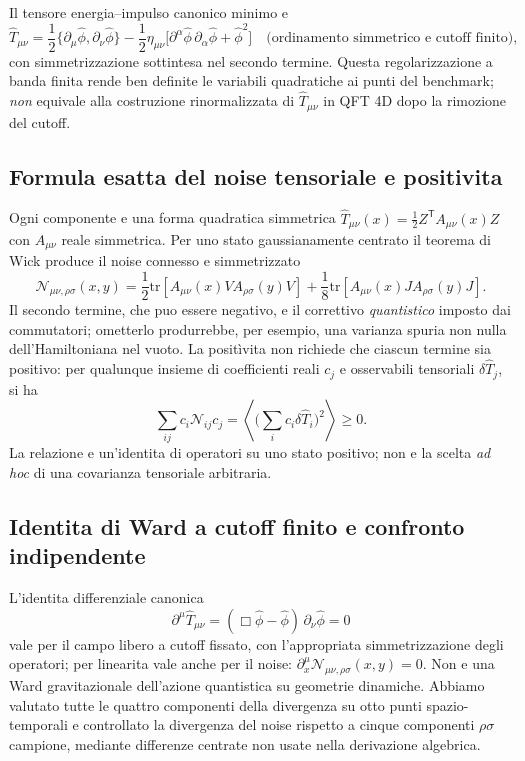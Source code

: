 \documentclass[11pt,a4paper]{article}
\begin{document}
Il tensore energia--impulso canonico minimo e
\begin{equation}
 \hat T_{\mu\nu}=\frac12\{\partial_\mu\hat\phi,\partial_\nu\hat\phi\}
 -\frac12\eta_{\mu\nu}\bigl[\partial^\alpha\hat\phi\,\partial_\alpha\hat\phi+\hat\phi^2\bigr]
 \quad\text{(ordinamento simmetrico e cutoff finito)},
 \label{eq:r12av-stress}
\end{equation}
con simmetrizzazione sottintesa nel secondo termine. Questa regolarizzazione a banda finita rende ben definite le variabili quadratiche ai punti del benchmark; \emph{non} equivale alla costruzione rinormalizzata di $\hat T_{\mu\nu}$ in QFT 4D dopo la rimozione del cutoff.

\subsection{Formula esatta del noise tensoriale e positivita}
Ogni componente e una forma quadratica simmetrica $\hat T_{\mu\nu}(x)=\frac12Z^{\mathsf T}A_{\mu\nu}(x)Z$ con $A_{\mu\nu}$ reale simmetrica. Per uno stato gaussianamente centrato il teorema di Wick produce il noise connesso e simmetrizzato
\begin{equation}
 \boxed{\mathcal N_{\mu\nu,\rho\sigma}(x,y)=
 \frac12\mathrm{tr}[A_{\mu\nu}(x)V A_{\rho\sigma}(y)V]
 +\frac18\mathrm{tr}[A_{\mu\nu}(x)J A_{\rho\sigma}(y)J].}
 \label{eq:r12av-noise}
\end{equation}
Il secondo termine, che puo essere negativo, e il correttivo \emph{quantistico} imposto dai commutatori; ometterlo produrrebbe, per esempio, una varianza spuria non nulla dell'Hamiltoniana nel vuoto. La posit\`ivita non richiede che ciascun termine sia positivo: per qualunque insieme di coefficienti reali $c_j$ e osservabili tensoriali $\delta\hat T_j$, si ha
\begin{equation}
 \sum_{ij}c_i\mathcal N_{ij}c_j=\left\langle\biggl(\sum_i c_i\delta\hat T_i\biggr)^2\right\rangle\ge0.
 \label{eq:r12av-psd}
\end{equation}
La relazione e un'identita di operatori su uno stato positivo; non e la scelta \emph{ad hoc} di una covarianza tensoriale arbitraria.

\subsection{Identita di Ward a cutoff finito e confronto indipendente}
L'identita differenziale canonica
\begin{equation}
 \partial^\mu\hat T_{\mu\nu}=(\Box\hat\phi-\hat\phi)\,\partial_\nu\hat\phi=0
 \label{eq:r12av-ward}
\end{equation}
vale per il campo libero a cutoff fissato, con l'appropriata simmetrizzazione degli operatori; per linearita vale anche per il noise: $\partial_x^\mu\mathcal N_{\mu\nu,\rho\sigma}(x,y)=0$. Non e una Ward gravitazionale dell'azione quantistica su geometrie dinamiche. Abbiamo valutato tutte le quattro componenti della divergenza su otto punti spazio-temporali e controllato la divergenza del noise rispetto a cinque componenti $\rho\sigma$ campione, mediante differenze centrate non usate nella derivazione algebrica.
\end{document}
